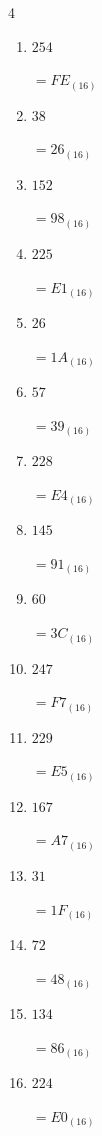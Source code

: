 \begin{multicols}{4}
\begin{enumerate}
  \item $254$

        $=FE_{(16)}$

  \item $38$

        $=26_{(16)}$

  \item $152$

        $=98_{(16)}$

  \item $225$

        $=E1_{(16)}$

  \item $26$

        $=1A_{(16)}$

  \item $57$

        $=39_{(16)}$

  \item $228$

        $=E4_{(16)}$

  \item $145$

        $=91_{(16)}$

  \item $60$

        $=3C_{(16)}$

  \item $247$

        $=F7_{(16)}$

  \item $229$

        $=E5_{(16)}$

  \item $167$

        $=A7_{(16)}$

  \item $31$

        $=1F_{(16)}$

\columnbreak %

\resetques

  \item $72$

        $=48_{(16)}$

  \item $134$

        $=86_{(16)}$

  \item $224$

        $=E0_{(16)}$


\end{enumerate}
\end{multicols}
